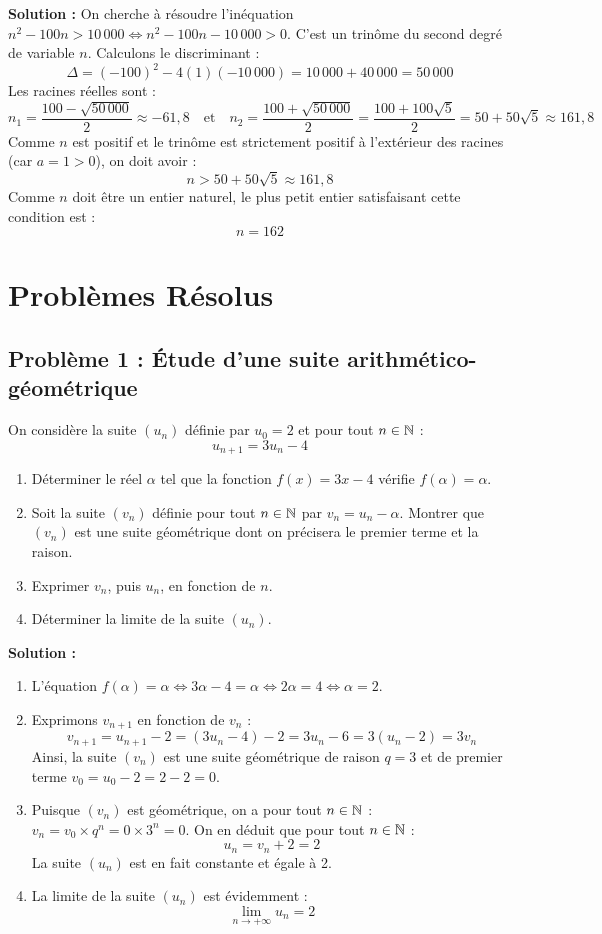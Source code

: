 \textbf{Solution :}
On cherche à résoudre l'inéquation $n^2 - 100n > 10\,000 \iff n^2 - 100n - 10\,000 > 0$.
C'est un trinôme du second degré de variable $n$. Calculons le discriminant :
\[
\Delta = (-100)^2 - 4(1)(-10\,000) = 10\,000 + 40\,000 = 50\,000
\]
Les racines réelles sont :
\[
n_1 = \frac{100 - \sqrt{50\,000}}{2} \approx -61,8 \quad \text{et} \quad n_2 = \frac{100 + \sqrt{50\,000}}{2} = \frac{100 + 100\sqrt{5}}{2} = 50 + 50\sqrt{5} \approx 161,8
\]
Comme $n$ est positif et le trinôme est strictement positif à l'extérieur des racines (car $a=1>0$), on doit avoir :
\[
n > 50 + 50\sqrt{5} \approx 161,8
\]
Comme $n$ doit être un entier naturel, le plus petit entier satisfaisant cette condition est :
\[
n = 162
\]

\section{Problèmes Résolus}

\subsection*{Problème 1 : Étude d'une suite arithmético-géométrique}
On considère la suite $(u_n)$ définie par $u_0 = 2$ et pour tout $n \in \mathbb{N}$ :
\[
u_{n+1} = 3u_n - 4
\]
\begin{enumerate}
    \item Déterminer le réel $\alpha$ tel que la fonction $f(x) = 3x - 4$ vérifie $f(\alpha) = \alpha$.
    \item Soit la suite $(v_n)$ définie pour tout $n \in \mathbb{N}$ par $v_n = u_n - \alpha$.
    Montrer que $(v_n)$ est une suite géométrique dont on précisera le premier terme et la raison.
    \item Exprimer $v_n$, puis $u_n$, en fonction de $n$.
    \item Déterminer la limite de la suite $(u_n)$.
\end{enumerate}

\textbf{Solution :}
\begin{enumerate}
    \item L'équation $f(\alpha) = \alpha \iff 3\alpha - 4 = \alpha \iff 2\alpha = 4 \iff \alpha = 2$.
    \item Exprimons $v_{n+1}$ en fonction de $v_n$ :
    \[
    v_{n+1} = u_{n+1} - 2 = (3u_n - 4) - 2 = 3u_n - 6 = 3(u_n - 2) = 3v_n
    \]
    Ainsi, la suite $(v_n)$ est une suite géométrique de raison $q = 3$ et de premier terme $v_0 = u_0 - 2 = 2 - 2 = 0$.
    \item Puisque $(v_n)$ est géométrique, on a pour tout $n \in \mathbb{N}$ : $v_n = v_0 \times q^n = 0 \times 3^n = 0$.
    On en déduit que pour tout $n \in \mathbb{N}$ :
    \[
    u_n = v_n + 2 = 2
    \]
    La suite $(u_n)$ est en fait constante et égale à 2.
    \item La limite de la suite $(u_n)$ est évidemment :
    \[
    \lim_{n \to +\infty} u_n = 2
    \]
\end{enumerate}

